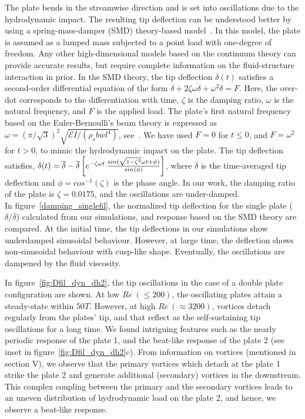 \documentclass[aps,pre,twocolumn,aps,longbibliography]{revtex4-1}
\begin{document}
	The plate bends in the streamwise direction and is set into oscillations due to the hydrodynamic impact. The resulting tip deflection can be understood better by using a spring-mass-damper (SMD) theory-based model~\cite{Kelley2004}. In this model, the plate is assumed as a lumped mass subjected to a point load with one-degree of freedom. Any other high-dimensional models based on the continuum theory can provide accurate results, but require complete information on the fluid-structure interaction in prior. In the SMD theory, the tip deflection $\delta(t)$ satisfies a second-order differential equation of the form $\ddot{\delta}+2\zeta\omega\dot{\delta}+\omega^2 \delta=F$. Here, the over-dot corresponds to the differentiation with time, $\zeta$ is the damping ratio, $\omega$ is the natural frequency, and $F$ is the applied load. The plate's first natural frequency based on the Euler-Bernoulli's beam theory is expressed as $\omega=\left(\pi/\sqrt{3}\right)^2\sqrt{\mathcal{E}I/(\rho_s bwl^4)}$, see~\cite{Kelley2004}. We have used $F=0$ for $t\le 0$, and $F=\omega^2$ for $t>0$, to mimic the hydrodynamic impact on the plate. The tip deflection satisfies, $\delta(t) = \overline{\delta} -\overline{\delta}\left[e^{-\zeta \omega t}\,{sin(\sqrt{1-\zeta^2} \omega t+\phi)\over sin(\phi)}\right]$, where $\overline{\delta}$ is the time-averaged tip deflection and $\phi=cos^{-1}(\zeta)$ is the phase angle. In our work, the damping ratio of the plate is $\zeta=0.0175$, and the oscillations are under-damped.\\
	
	
	
	
	In figure~\ref{damping_singlefil}, the normalized tip deflection for the single plate ($\delta/\overline{\delta}$) calculated from our simulations, and response based on the SMD theory are compared. At the initial time, the tip deflections in our simulations show underdamped sinusoidal behaviour. However, at large time, the deflection shows non-sinusoidal behaviour with cusp-like shape. Eventually, the oscillations are dampened by the fluid viscosity.
	
	In figure~\ref{fig:Dfil_dyn_dh2}, the tip oscillations in the case of a double plate configuration are shown. At low $Re~(\le200)$, the oscillating plates attain a steady-state within $50T$. However, at high $Re~(\approx3200)$, vortices detach regularly from the plates' tip, and that reflect as the self-sustaining tip oscillations for a long time. We found intriguing features such as the nearly periodic response of the plate 1, and the beat-like response of the plate 2 (see inset in figure~\ref{fig:Dfil_dyn_dh2}c). From information on vortices (mentioned in section V), we observe that the primary vortices which detach at the plate 1 strike the plate 2 and generate additional (secondary) vortices in the downstream. This complex coupling between the primary and the secondary vortices leads to an uneven distribution of hydrodynamic load on the plate 2, and hence, we observe a beat-like response.
	
\end{document}

